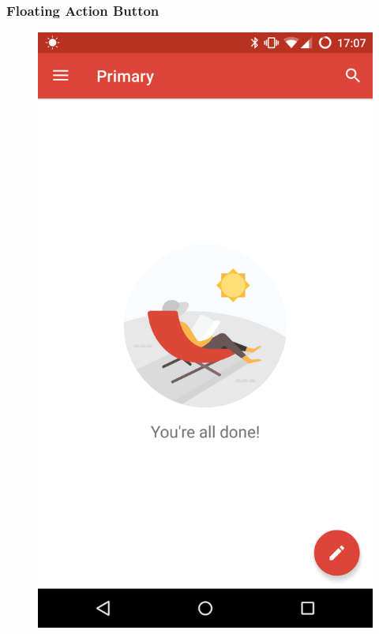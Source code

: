 \subsubsection{Floating Action Button}
\begin{figure}[H]
	\centering
	{{\includegraphics[scale=0.1]{figures/findings/fab-Gmail.png} }}%
	\qquad

\end{figure}
